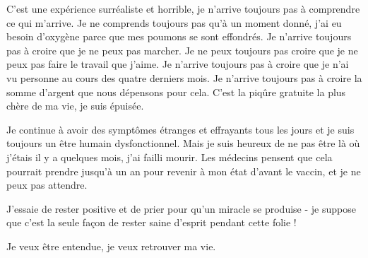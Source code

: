 {C'est une expérience surréaliste et horrible, je n'arrive toujours pas à
comprendre ce qui m'arrive. Je ne comprends toujours pas qu'à un moment donné,
j'ai eu besoin d'oxygène parce que mes poumons se sont effondrés. Je n'arrive
toujours pas à croire que je ne peux pas marcher. Je ne peux toujours pas croire
que je ne peux pas faire le travail que j'aime. Je n'arrive toujours pas à
croire que je n'ai vu personne au cours des quatre derniers mois. Je n'arrive
toujours pas à croire la somme d'argent que nous dépensons pour cela. C'est la
piqûre gratuite la plus chère de ma vie, je suis épuisée.

Je continue à avoir des symptômes étranges et effrayants tous les jours et je
suis toujours un être humain dysfonctionnel. Mais je suis heureux de ne pas être
là où j'étais il y a quelques mois, j'ai failli mourir. Les médecins pensent que
cela pourrait prendre jusqu'à un an pour revenir à mon état d'avant le vaccin,
et je ne peux pas attendre.

J'essaie de rester positive et de prier pour qu'un miracle se produise - je
suppose que c'est la seule façon de rester saine d'esprit pendant cette folie !

Je veux être entendue, je veux retrouver ma vie.

}
